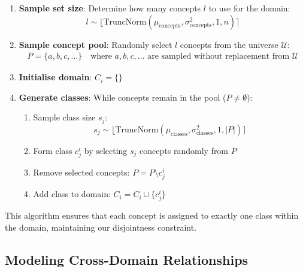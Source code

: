 \begin{enumerate}
      \item \textbf{Sample set size}: Determine how many concepts $l$ to use for the domain:
            \begin{equation*}
                  l \sim \lfloor\text{TruncNorm}(\mu_{\text{concepts}}, \sigma^2_{\text{concepts}}, 1, n)\rceil
            \end{equation*}

      \item \textbf{Sample concept pool}: Randomly select $l$ concepts from the universe $\mathcal{U}$:
            \begin{align*}
                  P = \{a, b, c, \ldots\} \quad \text{where } a, b, c, \ldots \text{ are sampled without replacement from } \mathcal{U}
            \end{align*}

      \item \textbf{Initialise domain}: $C_i = \{\}$

      \item \textbf{Generate classes}: While concepts remain in the pool ($P \neq \emptyset$):
            \begin{enumerate}
                  \item Sample class size $s_j$:
                        \begin{equation*}
                              s_j \sim \lfloor\text{TruncNorm}(\mu_{\text{classes}}, \sigma^2_{\text{classes}}, 1, |P|)\rceil
                        \end{equation*}

                  \item Form class $c^i_j$ by selecting $s_j$ concepts randomly from $P$

                  \item Remove selected concepts: $P = P \setminus c_j^i$

                  \item Add class to domain: $C_i = C_i \cup \{c^i_j\}$
            \end{enumerate}
\end{enumerate}

This algorithm ensures that each concept is assigned to exactly one class within the domain, maintaining our disjointness constraint.

\subsection{Modeling Cross-Domain Relationships}

